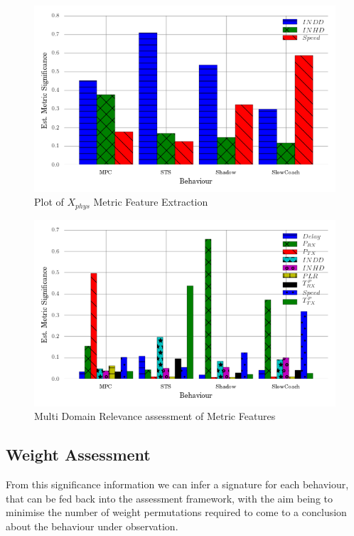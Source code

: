 \documentclass{aamas2016}
\begin{document}
\begin{figure}[h!]
	\centering
  \includegraphics[width=\linewidth]{phys_metric_trust_relevance}
	\caption{Plot of $X_{phys}$ Metric Feature Extraction}
	\label{fig:phys_feature_extraction}
\end{figure}

\begin{figure}[h!]
  \centering
  \includegraphics[width=\linewidth]{full_metric_trust_relevance}
  \caption{Multi Domain Relevance assessment of Metric Features}
  \label{fig:multi_feature_extraction}
\end{figure}

%

\subsection{Weight Assessment}

From this significance information we can infer a signature for each behaviour, that can be fed back into the assessment framework, with the aim being to minimise the number of weight permutations required to come to a conclusion about the behaviour under observation. 
\end{document}
